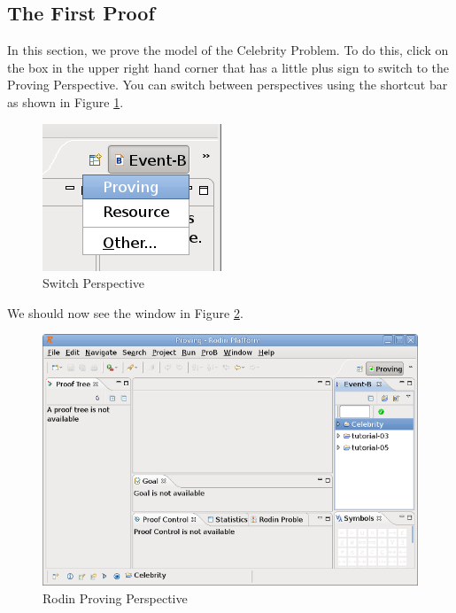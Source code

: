 \subsection{The First Proof}
\label{tut_first_proof}

In this section, we prove the model of the Celebrity Problem. To do this, click on the box in the upper right hand corner that has a little plus sign to switch to the Proving Perspective. You can switch between perspectives using the shortcut bar as shown in Figure \ref{fig_tut_08_switch_perspective}. 

\begin{figure}[!ht]
\begin{center}
	\includegraphics{img/tutorial/tut_08_switch_perspective.png}
	\caption{Switch Perspective}
	\label{fig_tut_08_switch_perspective}
\end{center}
\end{figure}


We should now see the window in Figure \ref{fig_tut_08_proving_perspective}. 

\begin{figure}[!ht]
\begin{center}
	\includegraphics{img/tutorial/tut_08_proving_perspective.png}
	\caption{Rodin Proving Perspective}
	\label{fig_tut_08_proving_perspective}
\end{center}
\end{figure}

